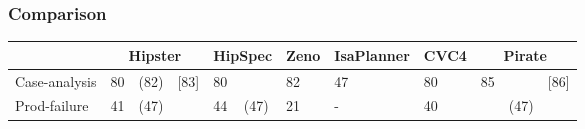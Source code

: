 \subsubsection{Comparison}

\begin{tabularx}{\textwidth}{l | X X X | X X | X | X | X | X X X}
  & \multicolumn{3}{|c|}{Hipster}
  	& \multicolumn{2}{c|}{HipSpec}
  	& \multicolumn{1}{c|}{Zeno}
  	& \multicolumn{1}{c|}{IsaPlanner}
  	& \multicolumn{1}{c|}{CVC4}
  	& \multicolumn{3}{c}{Pirate} \\
  \hline
  Case-analysis & 80 & (82) & [83] & 80 & & 82 & 47 & 80 & 85 & & [86] \\
  Prod-failure & 41 & (47) & & 44 & (47) & 21 & - & 40 & & (47) & \\
\end{tabularx}


